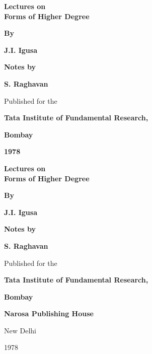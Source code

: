 \thispagestyle{empty}
\begin{center}
{\Large\bf Lectures on}\\[5pt]
{\Large\bf  Forms of Higher Degree}
\vskip 1cm

{\bf  By}
\medskip

{\large\bf  J.I. Igusa}
\vfill


{\bf  Notes by}
\medskip

{\large\bf  S. Raghavan}
\vfill

  Published for the 

{\bf  Tata Institute of Fundamental Research,}

{\bf  Bombay}

{\bf  1978}
\end{center}


\eject

\thispagestyle{empty}

\begin{center}
{\Large\bf Lectures on}\\[5pt]
{\Large\bf  Forms of Higher Degree}
\vskip 1cm

{\bf  By}
\medskip

{\large\bf  J.I. Igusa}
\medskip


\vfill
{\bf  Notes by}
\medskip

{\large\bf  S. Raghavan}
\vfill

Published for the 

{\bf  Tata Institute of Fundamental Research,}

{\bf  Bombay}


\begin{figure}[H]
\end{figure}

{\bf Narosa Publishing House}

New Delhi

1978 
\end{center}

\eject


